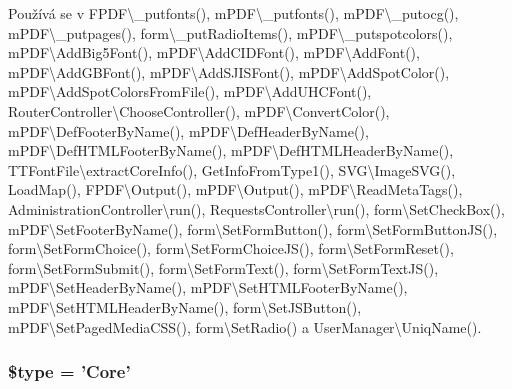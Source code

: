 Používá se v F\-P\-D\-F\textbackslash{}\-\_\-putfonts(), m\-P\-D\-F\textbackslash{}\-\_\-putfonts(), m\-P\-D\-F\textbackslash{}\-\_\-putocg(), m\-P\-D\-F\textbackslash{}\-\_\-putpages(), form\textbackslash{}\-\_\-put\-Radio\-Items(), m\-P\-D\-F\textbackslash{}\-\_\-putspotcolors(), m\-P\-D\-F\textbackslash{}\-Add\-Big5\-Font(), m\-P\-D\-F\textbackslash{}\-Add\-C\-I\-D\-Font(), m\-P\-D\-F\textbackslash{}\-Add\-Font(), m\-P\-D\-F\textbackslash{}\-Add\-G\-B\-Font(), m\-P\-D\-F\textbackslash{}\-Add\-S\-J\-I\-S\-Font(), m\-P\-D\-F\textbackslash{}\-Add\-Spot\-Color(), m\-P\-D\-F\textbackslash{}\-Add\-Spot\-Colors\-From\-File(), m\-P\-D\-F\textbackslash{}\-Add\-U\-H\-C\-Font(), Router\-Controller\textbackslash{}\-Choose\-Controller(), m\-P\-D\-F\textbackslash{}\-Convert\-Color(), m\-P\-D\-F\textbackslash{}\-Def\-Footer\-By\-Name(), m\-P\-D\-F\textbackslash{}\-Def\-Header\-By\-Name(), m\-P\-D\-F\textbackslash{}\-Def\-H\-T\-M\-L\-Footer\-By\-Name(), m\-P\-D\-F\textbackslash{}\-Def\-H\-T\-M\-L\-Header\-By\-Name(), T\-T\-Font\-File\textbackslash{}extract\-Core\-Info(), Get\-Info\-From\-Type1(), S\-V\-G\textbackslash{}\-Image\-S\-V\-G(), Load\-Map(), F\-P\-D\-F\textbackslash{}\-Output(), m\-P\-D\-F\textbackslash{}\-Output(), m\-P\-D\-F\textbackslash{}\-Read\-Meta\-Tags(), Administration\-Controller\textbackslash{}run(), Requests\-Controller\textbackslash{}run(), form\textbackslash{}\-Set\-Check\-Box(), m\-P\-D\-F\textbackslash{}\-Set\-Footer\-By\-Name(), form\textbackslash{}\-Set\-Form\-Button(), form\textbackslash{}\-Set\-Form\-Button\-J\-S(), form\textbackslash{}\-Set\-Form\-Choice(), form\textbackslash{}\-Set\-Form\-Choice\-J\-S(), form\textbackslash{}\-Set\-Form\-Reset(), form\textbackslash{}\-Set\-Form\-Submit(), form\textbackslash{}\-Set\-Form\-Text(), form\textbackslash{}\-Set\-Form\-Text\-J\-S(), m\-P\-D\-F\textbackslash{}\-Set\-Header\-By\-Name(), m\-P\-D\-F\textbackslash{}\-Set\-H\-T\-M\-L\-Footer\-By\-Name(), m\-P\-D\-F\textbackslash{}\-Set\-H\-T\-M\-L\-Header\-By\-Name(), form\textbackslash{}\-Set\-J\-S\-Button(), m\-P\-D\-F\textbackslash{}\-Set\-Paged\-Media\-C\-S\-S(), form\textbackslash{}\-Set\-Radio() a User\-Manager\textbackslash{}\-Uniq\-Name().

\hypertarget{courier_8php_a9a4a6fba2208984cabb3afacadf33919}{
\subsubsection[{\$type}]{\setlength{\rightskip}{0pt plus 5cm}\$type = 'Core'}}\label{courier_8php_a9a4a6fba2208984cabb3afacadf33919}


